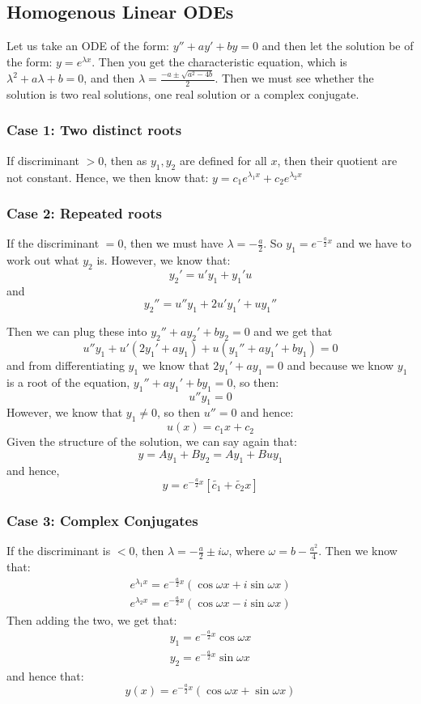 \documentclass{article}
\renewcommand{\l}{\lambda}
\begin{document}
\subsection{Homogenous Linear ODEs}

Let us take an ODE of the form: $y'' + ay' + by = 0$ and then let the solution be of the form: $y = e^{\l x}$. Then you get the characteristic equation, which is $\l^2 + a\l + b = 0$, and then $\displaystyle{\l = \frac{-a \pm \sqrt{a^2 - 4b}}{2}}$. Then we must see whether the solution is two real solutions, one real solution or a complex conjugate.

\subsubsection{Case 1: Two distinct roots}
If discriminant $> 0$, then as $y_1,y_2$ are defined for all $x$, then their quotient are not constant. Hence, we then know that: $y = c_1e^{\l_1 x} + c_2e^{\l_2 x}$

\subsubsection{Case 2: Repeated roots}
If the discriminant $=0$, then we must have $\displaystyle{\l = -\frac{a}{2}}$. So $y_1 = e^{-\frac{a}{2}x}$ and we have to work out what $y_2$ is. However, we know that:
$$  y_2' = u'y_1 + y_1'u $$ and $$ y_2'' = u''y_1 + 2u'y_1' + uy_1'' $$

Then we can plug these into $\displaystyle{y_2'' + ay_2' + by_2 = 0}$ and we get that
$$u''y_1 + u'(2y_1' + ay_1) + u(y_1'' + ay_1' + by_1) = 0$$
and from differentiating $y_1$ we know that $2y_1' + ay_1 = 0$ and because we know $y_1$ is a root of the equation, $y_1'' + ay_1' + by_1 = 0$, so then:
$$ u''y_1 = 0 $$
However, we know that $y_1 \neq 0$, so then $u'' = 0$ and hence:
$$ u(x) = c_1x + c_2 $$
Given the structure of the solution, we can say again that:
$$ y = Ay_1 + By_2 = Ay_1 + Buy_1$$
and hence,
$$ y = e^{-\frac{a}{2}x}\left[ \widetilde{c_1} + \widetilde{c_2}x \right] $$

\subsubsection{Case 3: Complex Conjugates}
If the discriminant is $< 0$, then $\l = -\frac{a}{2} \pm i \omega$, where $\omega = b - \frac{a^2}{4}$. Then we know that:
\begin{align}
  e^{\l_1 x} = e^{-\frac{a}{2}x}(\cos \omega x + i\sin \omega x) \\
  e^{\l_2 x} = e^{-\frac{a}{2}x}(\cos \omega x - i\sin \omega x)
\end{align}
Then adding the two, we get that:
\begin{align}
  y_1 = e^{-\frac{a}{2} x}\cos \omega x \\
  y_2 = e^{-\frac{a}{2} x}\sin \omega x
\end{align}
and hence that:
$$ y(x) = e^{-\frac{a}{2} x}(\cos \omega x + \sin \omega x) $$
\end{document}
